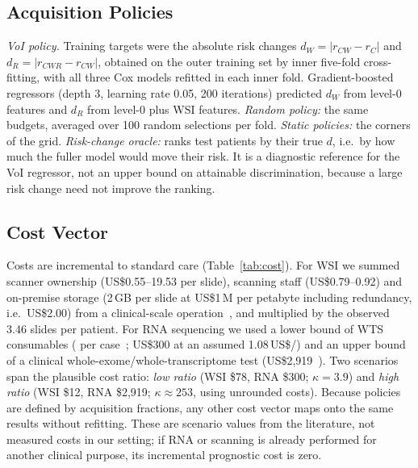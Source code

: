 \documentclass[journal,twoside]{IEEEtran}
\begin{document}
\subsection{Acquisition Policies}
\textit{VoI policy.} Training targets were the absolute risk changes $d_W = |r_{CW} - r_C|$ and $d_R = |r_{CWR} - r_{CW}|$, obtained on the outer training set by inner five-fold cross-fitting, with all three Cox models refitted in each inner fold. Gradient-boosted regressors (depth 3, learning rate 0.05, 200 iterations) predicted $d_W$ from level-0 features and $d_R$ from level-0 plus WSI features. \textit{Random policy:} the same budgets, averaged over 100 random selections per fold. \textit{Static policies:} the corners of the grid. \textit{Risk-change oracle:} ranks test patients by their true $d$, i.e.\ by how much the fuller model would move their risk. It is a diagnostic reference for the VoI regressor, not an upper bound on attainable discrimination, because a large risk change need not improve the ranking.

\subsection{Cost Vector}
Costs are incremental to standard care (Table~\ref{tab:cost}). For WSI we summed scanner ownership (US\$0.55--19.53 per slide), scanning staff (US\$0.79--0.92) and on-premise storage (2\,GB per slide at US\$1\,M per petabyte including redundancy, i.e.\ US\$2.00) from a clinical-scale operation~\cite{ardon2023}, and multiplied by the observed 3.46 slides per patient. For RNA sequencing we used a lower bound of WTS consumables ( per case~\cite{altburger2026}; US\$300 at an assumed 1.08\,US\$/\texteuro) and an upper bound of a clinical whole-exome/whole-transcriptome test (US\$2,919~\cite{ortendahl2025}). Two scenarios span the plausible cost ratio: \emph{low ratio} (WSI \$78, RNA \$300; $\kappa = 3.9$) and \emph{high ratio} (WSI \$12, RNA \$2,919; $\kappa \approx 253$, using unrounded costs). Because policies are defined by acquisition fractions, any other cost vector maps onto the same results without refitting. These are scenario values from the literature, not measured costs in our setting; if RNA or scanning is already performed for another clinical purpose, its incremental prognostic cost is zero.
\end{document}
